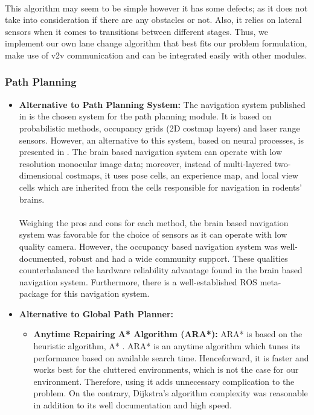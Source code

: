 \\
This algorithm may seem to be simple however it has some defects; as it does not take into consideration if there are any obstacles or not. Also, it relies on lateral sensors when it comes to transitions between different stages\cite{doi:10.1002/atr.5670430104}. Thus, we implement our own lane change algorithm that best fits our problem formulation, make use of v2v communication and can be integrated easily with other modules. 

\subsubsection{Path Planning}
\label{des_path_plan}
\begin{itemize}
\item \textbf{Alternative to Path Planning System:}
The navigation system published in \cite{tbd} is the chosen system for the path planning module. It is based on probabilistic methods, occupancy grids (2D costmap layers) and laser range sensors. However, an alternative to this system, based on neural processes, is presented in \cite{ratSlam}. The brain based navigation system can operate with low resolution monocular image data; moreover, instead of multi-layered two-dimensional costmaps, it uses pose cells, an experience map, and local view cells which are inherited from the cells responsible for navigation in rodents' brains. 
\\ \\
Weighing the pros and cons for each method, the brain based navigation system was favorable for the choice of sensors as it can operate with low quality camera. However, the occupancy based navigation system was well-documented, robust and had a wide community support. These qualities counterbalanced the hardware reliability advantage found in the brain based navigation system. Furthermore, there is a well-established ROS meta-package for this navigation system. 

\item \textbf{Alternative to Global Path Planner:}
\begin{itemize}
    \item \textbf{Anytime Repairing A* Algorithm (ARA*):}
    ARA* is based on the heuristic algorithm, A* \cite{Astar}. ARA* is an anytime algorithm which tunes its performance based on available search time. Henceforward, it is faster and works best for the cluttered environments, which is not the case for our environment. Therefore, using it adds unnecessary complication to the problem. On the contrary, Dijkstra's algorithm complexity was reasonable in addition to its well documentation and high speed. 
\end{itemize}


\end{itemize}
